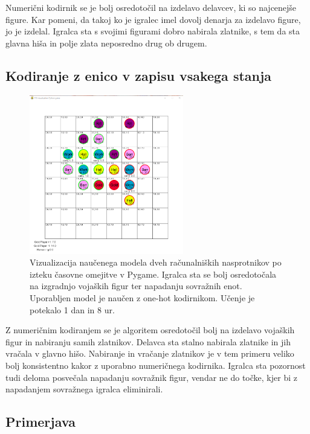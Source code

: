 \documentclass[a4paper, 12pt]{book}
\begin{document}
Numerični kodirnik se je bolj osredotočil na izdelavo delavcev, ki so najcenejše figure. 
Kar pomeni, da takoj ko je igralec imel dovolj denarja za izdelavo figure, jo je izdelal.
Igralca sta s svojimi figurami dobro nabirala zlatnike, s tem da sta glavna hiša in polje zlata neposredno drug ob drugem.

\subsection{Kodiranje z enico v zapisu vsakega stanja}

\begin{figure}[h]
	\begin{center}
		\includegraphics[width=0.6\textwidth]{photos/first-onehot.pdf}
	\end{center}
	\caption{Vizualizacija naučenega modela dveh računalniških nasprotnikov po izteku časovne omejitve v Pygame. Igralca sta se bolj osredotočala na izgradnjo vojaških figur ter napadanju sovražnih enot.
		Uporabljen model je naučen z one-hot kodirnikom. Učenje je potekalo 1 dan in 8 ur.}
	\label{vizualizacijaRezultatovOneHotKodirnik100Timeout}
\end{figure}

Z numeričnim kodiranjem se je algoritem osredotočil bolj na izdelavo vojaških figur in nabiranju samih zlatnikov.
Delavca sta stalno nabirala zlatnike in jih vračala v glavno hišo. 
Nabiranje in vračanje zlatnikov je v tem primeru veliko bolj konsistentno kakor z uporabno numeričnega kodirnika.
Igralca sta pozornost tudi deloma posvečala napadanju sovražnik figur, vendar ne do točke, kjer bi z napadanjem sovražnega igralca eliminirali.

\subsection{Primerjava}
\end{document}
